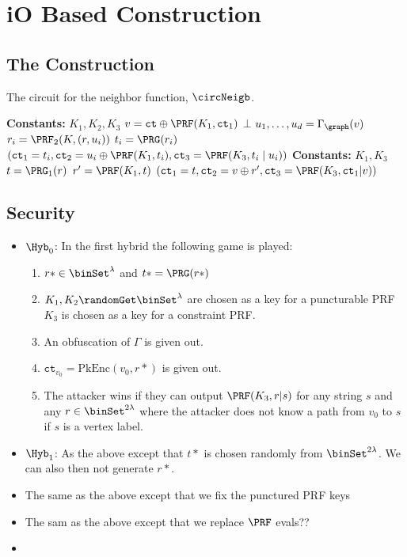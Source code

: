 \newcommand{\ct}{\texttt{ct}}
\section{iO Based Construction}
\subsection{The Construction}
\begin{algorithm}[H]
	\caption{
		The circuit for the neighbor function, $\circNeigb$.
	}
	\begin{algorithmic}[1]
		\Function{$\Gamma$}{$\ct_1, \ct_2, \ct_3, i$} %
			\State \textbf{Constants:} $K_1, K_2, K_3$
			\State $v = \ct \oplus \PRF(K_1, \ct_1)$
			\State \If{$\PRF(K_3, \ct_1 \mid v) \neq \ct_3$}
				\State \Return $\bot$
			\EndIf
			\State $u_1, \dots, u_d = \Gamma_\graph(v)$
			\State $r_i = \PRF_2(K, (r, u_i))$
			\State $t_i= \PRG(r_i)$
			\State \Return $(\ct_1 = t_i, \ct_2 = u_i \oplus \PRF(K_1, t_i), \ct_3 = \PRF(K_3, t_i \mid u_i))$
		\EndFunction
			\State \textbf{Constants:} $K_1, K_3$
			\State $t = \PRG_1(r)$
			\State $r' = \PRF(K_1, t)$
			\State \Return $(\ct_1 = t, \ct_2 = v \oplus r', \ct_3 = \PRF(K_3, \ct_1 | v))$
		\EndFunction
	\end{algorithmic}
	\label{alg:neighb}
\end{algorithm}

\subsection{Security}
\begin{itemize}
	\item $\Hyb_0$: In the first hybrid the following game is played:
		\begin{enumerate}
			\item $r* \in \binSet^\lambda$ and $t* = \PRG(r*)$
			\item $K_1, K_2 \randomGet \binSet^\lambda$ are chosen as a key for a puncturable PRF
			$K_3$ is chosen as a key for a constraint PRF. %
			\item An obfuscation of $\Gamma$ is given out.
			\item $\ct_{v_0} = \text{PkEnc}(v_0, r*)$ is given out.
			\item The attacker wins if they can output $\PRF(K_3, r | s)$ for any string 
			$s$ and any $r \in \binSet^{2\lambda}$ where
			the attacker does not know a path from $v_0$ to $s$ if $s$ is a vertex label.
		\end{enumerate}
	\item $\Hyb_1$: As the above except that $t*$ is chosen randomly from $\binSet^{2\lambda}$.
	We can also then not generate $r*$.
	\item The same as the above except that we fix the punctured PRF keys
	\item The sam as the above except that we replace $\PRF$ evals??
	\item 
\end{itemize}
